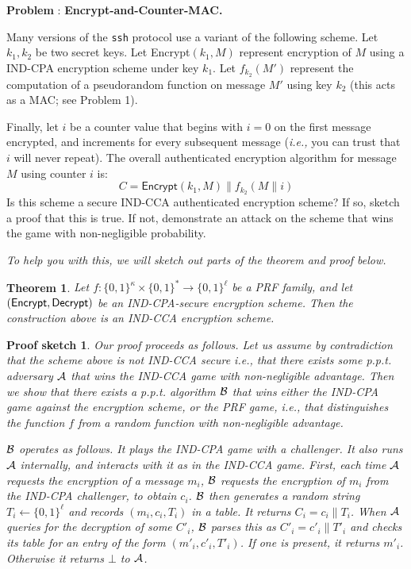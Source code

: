 \documentclass[11pt]{article}
\newtheorem{theorem}{Theorem}
\newtheorem{proofsketch}{Proof sketch}
\newcounter{problem}
\renewcommand{\theproblem}{\arabic{problem}}
\newenvironment{problem} {\stepcounter{problem} \textbf{Problem
    \theproblem}:} {\vspace{.1in}}
\begin{document}
\begin{problem} {\bf Encrypt-and-Counter-MAC.} 

\medskip \noindent
Many versions of the {\tt ssh} protocol use a variant of the following scheme. Let $k_1, k_2$ be two secret keys. Let {\sf Encrypt}$(k_1, M)$ represent encryption of $M$ using a {\sf IND-CPA} encryption scheme under key $k_1$. Let $f_{k_2}(M')$ represent the computation of a pseudorandom function on message $M'$ using key $k_2$ (this acts as a MAC; see Problem 1). 

\medskip \noindent
Finally, let $i$ be a counter value that begins with $i=0$ on the first message encrypted, and increments for every subsequent message  ({\em i.e.,} you can trust that $i$ will never repeat). The overall authenticated encryption algorithm for message $M$ using counter $i$ is:
$$C =  \mathsf{Encrypt}(k_1, M) \| f_{k_2}(M \| i) $$
Is this scheme a secure {\sf IND-CCA} authenticated encryption scheme? If so, sketch a proof that this is true. If not, demonstrate an attack on the scheme that wins the game with non-negligible probability.

\medskip \noindent
{\em To help you with this, we will sketch out parts of the theorem and proof below.}

\begin{theorem}
{\em
Let $f: \{0,1\}^{\kappa} \times \{0,1\}^* \rightarrow \{0,1\}^{\ell}$ be a PRF family, and let $({\sf Encrypt}, {\sf Decrypt})$ be an {\sf IND-CPA}-secure encryption scheme. Then the construction above is an {\sf IND-CCA} encryption scheme.}

\end{theorem}

\begin{proofsketch}
{\em
Our proof proceeds as follows. Let us assume by contradiction that the scheme above is {\em not} {\sf IND-CCA} secure {\em i.e.,} that there exists some p.p.t. adversary ${\cal A}$ that wins the {\sf IND-CCA} game with non-negligible advantage.
Then we show that there exists a p.p.t. algorithm ${\cal B}$ that wins either the {\sf IND-CPA} game against the encryption scheme, or the {\sf PRF} game, {\em i.e.,} that distinguishes the function $f$ from a random function with non-negligible advantage.

${\cal B}$ operates as follows. It plays the {\sf IND-CPA} game with a challenger. It also runs ${\cal A}$ internally, and interacts with it as in the {\sf IND-CCA} game. First, each time ${\cal A}$ requests the encryption of a message $m_i$, ${\cal B}$ requests the encryption of $m_i$ from the {\sf IND-CPA} challenger, to obtain $c_i$. ${\cal B}$ then generates a random string $T_i \leftarrow \{0,1\}^{\ell}$ and records $(m_i, c_i, T_i)$ in a table. It returns $C_i = c_i \| T_i$. When ${\cal A}$ queries for the decryption of some $C'_i$, ${\cal B}$ parses this as $C'_i = c'_i \| T'_i$ and checks its table for an entry of the form $(m'_i, c'_i, T'_i)$. If one is present, it returns $m'_i$. Otherwise it returns $\bot$ to ${\cal A}$. 

}
\end{proofsketch}
\end{problem}
\end{document}
